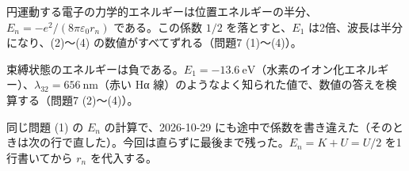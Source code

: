 \documentclass[uplatex,dvipdfmx,a4paper,11pt]{jsarticle}
\begin{document}
\matome
\begin{saitenichiran}
\end{saitenichiran}
\begin{daiji}
  \item 円運動する電子の力学的エネルギーは位置エネルギーの半分、$E_{n}=-e^{2}/(8\pi\varepsilon_{0}r_{n})$ である。この係数 $1/2$ を落とすと、$E_{1}$ は2倍、波長は半分になり、(2)〜(4) の数値がすべてずれる（問題7 (1)〜(4)）。
  \item 束縛状態のエネルギーは負である。$E_{1}=\qty{-13.6}{\electronvolt}$（水素のイオン化エネルギー）、$\lambda_{32}=\qty{656}{\nano\metre}$（赤い Hα 線）のようなよく知られた値で、数値の答えを検算する（問題7 (2)〜(4)）。
\end{daiji}
\begin{maemo}
  \item 同じ問題 (1) の $E_{n}$ の計算で、2026-10-29 にも途中で係数を書き違えた（そのときは次の行で直した）。今回は直らずに最後まで残った。$E_{n}=K+U=U/2$ を1行書いてから $r_{n}$ を代入する。
\end{maemo}
\end{document}
